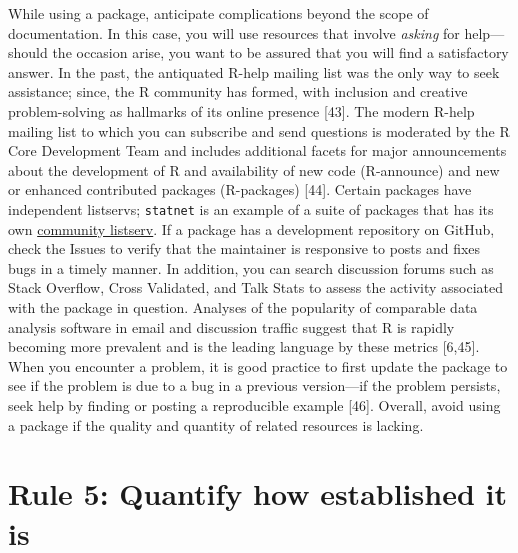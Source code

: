 \documentclass[10pt,letterpaper]{article}
\begin{document}
While using a package, anticipate complications beyond the scope of
documentation. In this case, you will use resources that involve
\emph{asking} for help---should the occasion arise, you want to be
assured that you will find a satisfactory answer. In the past, the
antiquated R-help mailing list was the only way to seek assistance;
since, the R community has formed, with inclusion and creative
problem-solving as hallmarks of its online presence {[}43{]}. The modern
R-help mailing list to which you can subscribe and send questions is
moderated by the R Core Development Team and includes additional facets
for major announcements about the development of R and availability of
new code (R-announce) and new or enhanced contributed packages
(R-packages) {[}44{]}. Certain packages have independent listservs;
\texttt{statnet} is an example of a suite of packages that has its own
\href{http://statnet.org/}{community listserv}. If a package has a
development repository on GitHub, check the Issues to verify that the
maintainer is responsive to posts and fixes bugs in a timely manner. In
addition, you can search discussion forums such as Stack Overflow, Cross
Validated, and Talk Stats to assess the activity associated with the
package in question. Analyses of the popularity of comparable data
analysis software in email and discussion traffic suggest that R is
rapidly becoming more prevalent and is the leading language by these
metrics {[}6,45{]}. When you encounter a problem, it is good practice to
first update the package to see if the problem is due to a bug in a
previous version---if the problem persists, seek help by finding or
posting a reproducible example {[}46{]}. Overall, avoid using a package
if the quality and quantity of related resources is lacking.

\hypertarget{rule-5-quantify-how-established-it-is}{%
\section{Rule 5: Quantify how established it
is}\label{rule-5-quantify-how-established-it-is}}
\end{document}

